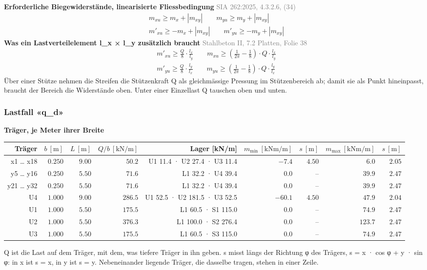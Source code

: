\documentclass[11pt,a4paper]{article}
\newcommand{\normref}[1]{{\small\textcolor{gray}{#1}}}
\begin{document}
\noindent\textbf{Erforderliche Biegewiderstände, linearisierte Fliessbedingung} \hfill \normref{SIA 262:2025, 4.3.2.6, (34)}
\begin{equation*}
\begin{aligned} & m_{xu} \ge m_x + |m_{xy}| \qquad m_{yu} \ge m_y + |m_{xy}| \\ & m'_{xu} \ge -m_x + |m_{xy}| \qquad m'_{yu} \ge -m_y + |m_{xy}| \end{aligned}
\end{equation*}
\noindent\textbf{Was ein Lastverteilelement l\_x × l\_y zusätzlich braucht} \hfill \normref{Stahlbeton II, 7.2 Platten, Folie 38}
\begin{equation*}
\begin{aligned} & m'_{xu} \ge \frac{Q}{8} \cdot \frac{l_x}{l_y} \qquad m_{xu} \ge \left(\frac{1}{2\pi} - \frac{1}{8}\right) \cdot Q \cdot \frac{l_x}{l_y} \\ & m'_{yu} \ge \frac{Q}{8} \cdot \frac{l_y}{l_x} \qquad m_{yu} \ge \left(\frac{1}{2\pi} - \frac{1}{8}\right) \cdot Q \cdot \frac{l_y}{l_x} \end{aligned}
\end{equation*}
Über einer Stütze nehmen die Streifen die Stützenkraft Q als gleichmässige Pressung im Stützenbereich ab; damit sie als Punkt hineinpasst, braucht der Bereich die Widerstände oben. Unter einer Einzellast Q tauschen oben und unten.

\subsubsection{Lastfall «q\_d»}
\noindent\textbf{Träger, je Meter ihrer Breite}
\begin{longtable}{rrrrrrrrr}
\hline
Träger & $b\ [\mathrm{m}]$ & $L\ [\mathrm{m}]$ & $Q/b\ [\mathrm{kN/m}]$ & Lager [kN/m] & $m_{\min}\ [\mathrm{kNm/m}]$ & $s\ [\mathrm{m}]$ & $m_{\max}\ [\mathrm{kNm/m}]$ & $s\ [\mathrm{m}]$ \\
\hline
\endhead
x1 … x18 & $0.250$ & $9.00$ & $50.2$ & U1 11.4 · U2 27.4 · U3 11.4 & $-7.4$ & $4.50$ & $6.0$ & $2.05$ \\
y5 … y16 & $0.250$ & $5.50$ & $71.6$ & L1 32.2 · U4 39.4 & $0.0$ & – & $39.9$ & $2.47$ \\
y21 … y32 & $0.250$ & $5.50$ & $71.6$ & L1 32.2 · U4 39.4 & $0.0$ & – & $39.9$ & $2.47$ \\
U4 & $1.000$ & $9.00$ & $286.5$ & U1 52.5 · U2 181.5 · U3 52.5 & $-60.1$ & $4.50$ & $47.9$ & $2.04$ \\
U1 & $1.000$ & $5.50$ & $175.5$ & L1 60.5 · S1 115.0 & $0.0$ & – & $74.9$ & $2.47$ \\
U2 & $1.000$ & $5.50$ & $376.3$ & L1 100.0 · S2 276.4 & $0.0$ & – & $123.7$ & $2.47$ \\
U3 & $1.000$ & $5.50$ & $175.5$ & L1 60.5 · S3 115.0 & $0.0$ & – & $74.9$ & $2.47$ \\
\hline
\end{longtable}
Q ist die Last auf dem Träger, mit dem, was tiefere Träger in ihn geben. s misst längs der Richtung φ des Trägers, s = x · cos φ + y · sin φ: in x ist s = x, in y ist s = y. Nebeneinander liegende Träger, die dasselbe tragen, stehen in einer Zeile.
\end{document}
